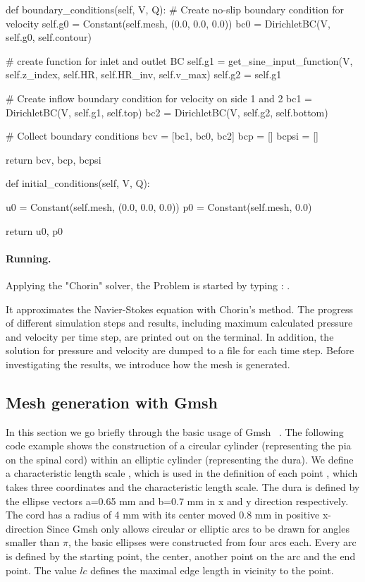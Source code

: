\begin{python}
def boundary_conditions(self, V, Q):
	# Create no-slip boundary condition for velocity
	self.g0 = Constant(self.mesh, (0.0, 0.0, 0.0))
	bc0 = DirichletBC(V, self.g0, self.contour)

	# create function for inlet and outlet BC
	self.g1 = get_sine_input_function(V, self.z_index, self.HR, self.HR_inv, self.v_max)
	self.g2 = self.g1

	# Create inflow boundary condition for velocity on side 1 and 2
	bc1 = DirichletBC(V, self.g1, self.top)
	bc2 = DirichletBC(V, self.g2, self.bottom)

	# Collect boundary conditions
	bcv = [bc1, bc0, bc2]
	bcp = []
	bcpsi = []

	return bcv, bcp, bcpsi

def initial_conditions(self, V, Q):

	u0 = Constant(self.mesh, (0.0, 0.0, 0.0))
	p0 = Constant(self.mesh, 0.0)

	return u0, p0
\end{python}


\paragraph{Running.}
Applying the "Chorin" solver, the Problem is started by typing :
.

It approximates the Navier-Stokes equation with Chorin's method. The progress of different simulation steps and results, including maximum calculated pressure and velocity per time step, are printed out on the terminal. In addition, the solution for pressure and velocity are dumped to a file for each  time step. Before investigating the results, we introduce how the mesh is generated.

\subsection{Mesh generation with Gmsh} 

In this section we go briefly through the basic usage of Gmsh ~\cite{GeuzaineRemacle}.  The following code example shows the construction of a circular cylinder (representing the pia on the spinal cord) within an elliptic cylinder (representing the dura). 
We define a characteristic length scale , which is used in the definition of each point , which 
takes three coordinates and the characteristic length scale. 
The dura is defined by the ellipse vectors a=0.65 mm and b=0.7 mm in x and y direction respectively. The cord has a radius of 4 mm with its center moved 0.8 mm in positive x-direction  Since Gmsh only allows circular or elliptic arcs to be drawn for angles smaller than $\pi$, the basic ellipses were constructed from four arcs each. Every arc is defined by the starting point, the center, another point on the arc and the end point. The value $lc$  defines the maximal edge length in vicinity to the point.

